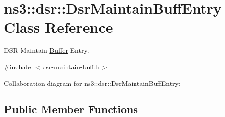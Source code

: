 \hypertarget{classns3_1_1dsr_1_1DsrMaintainBuffEntry}{}\section{ns3\+:\+:dsr\+:\+:Dsr\+Maintain\+Buff\+Entry Class Reference}
\label{classns3_1_1dsr_1_1DsrMaintainBuffEntry}


D\+SR Maintain \hyperlink{classns3_1_1Buffer}{Buffer} Entry.  




{\ttfamily \#include $<$dsr-\/maintain-\/buff.\+h$>$}



Collaboration diagram for ns3\+:\+:dsr\+:\+:Dsr\+Maintain\+Buff\+Entry\+:
\subsection*{Public Member Functions}
